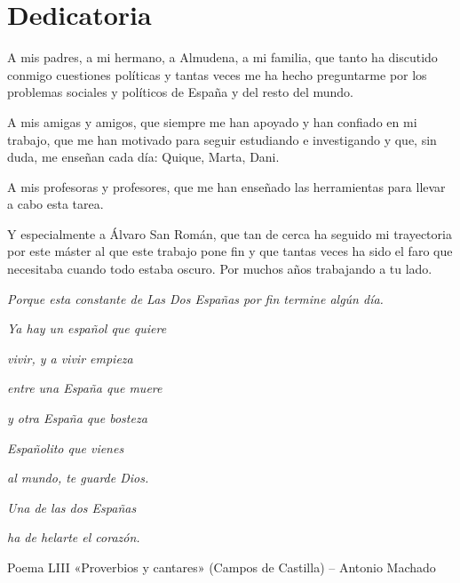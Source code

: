 \documentclass[a4paper, svgnames]{article}
\begin{document}
\section*{Dedicatoria}
\setcounter{page}{5}

A mis padres, a mi hermano, a Almudena, a mi familia, que tanto ha discutido conmigo cuestiones políticas y tantas veces me ha hecho preguntarme por los problemas sociales y políticos de España y del resto del mundo. 

\noindent
A mis amigas y amigos, que siempre me han apoyado y han confiado en mi trabajo, que me han motivado para seguir estudiando e investigando y que, sin duda, me enseñan cada día: Quique, Marta, Dani.

\noindent
A mis profesoras y profesores, que me han enseñado las herramientas para llevar a cabo esta tarea.

\noindent
Y especialmente a Álvaro San Román, que tan de cerca ha seguido mi trayectoria por este máster al que este trabajo pone fin y que tantas veces ha sido el faro que necesitaba cuando todo estaba oscuro. Por muchos años trabajando a tu lado.

\vspace{2cm}

\textit{Porque esta constante de Las Dos Españas por fin termine algún día.}

\text{ }

\begin{flushright}
	\textit{Ya hay un español que quiere}

	\textit{vivir, y a vivir empieza}

	\textit{entre una España que muere}

	\textit{y otra España que bosteza}

	\textit{Españolito que vienes}

	\textit{al mundo, te guarde Dios.}

	\textit{Una de las dos Españas}

	\textit{ha de helarte el corazón.}

	Poema LIII «Proverbios y cantares» (Campos de Castilla) – Antonio Machado
\end{flushright}



\vfill
\newpage %
\thispagestyle{empty}
\mbox{}
\newpage

\tableofcontents

\newpage %
\thispagestyle{empty}
\mbox{}
\end{document}
